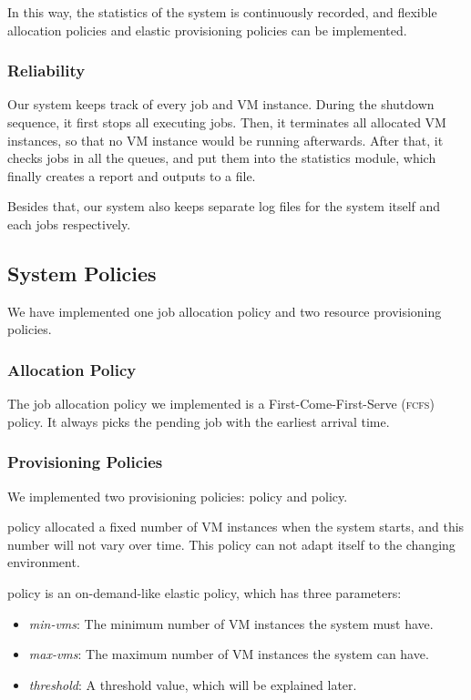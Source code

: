 In this way, the statistics of the system is continuously recorded,
and flexible allocation policies and elastic provisioning policies can
be implemented.


\subsubsection{Reliability}
Our system keeps track of every job and VM instance. During the
shutdown sequence, it first stops all executing jobs. Then, it
terminates all allocated VM instances, so that no VM instance would be
running afterwards. After that, it checks jobs in all the queues, and
put them into the statistics module, which finally creates a report
and outputs to a file.

Besides that, our system also keeps separate log files for the system
itself and each jobs respectively.


\subsection{System Policies}
We have implemented one job allocation policy and two resource
provisioning policies.

\subsubsection{Allocation Policy}
The job allocation policy we implemented is a First-Come-First-Serve
(\textsc{fcfs}) policy. It always picks the pending job with the
earliest arrival time.

\subsubsection{Provisioning Policies}
We implemented two provisioning policies: \policystatic{} policy and
\policysimpleelastic{} policy.

\policystatic{} policy allocated a fixed number of VM instances when the
system starts, and this number will not vary over time. This policy
can not adapt itself to the changing environment.

\policysimpleelastic{} policy is an on-demand-like elastic policy, which has
three parameters:

\begin{itemize}
\item \emph{min-vms}: The minimum number of VM instances the system
  must have.
\item \emph{max-vms}: The maximum number of VM instances the system can
  have.
\item \emph{threshold}: A threshold value, which will be explained
  later.
\end{itemize}

